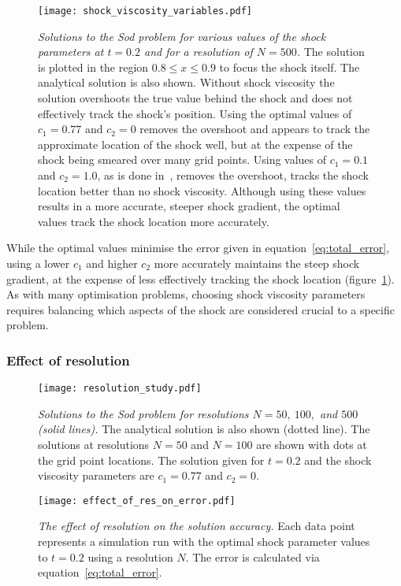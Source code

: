 \begin{figure}[t]
  \centering
  \texttt{[image: shock\_viscosity\_variables.pdf]}
  \caption{\emph{Solutions to the Sod problem for various values of the shock parameters at $t=0.2$ and for a resolution of $N=500$.} The solution is plotted in the region $0.8 \leq x \leq 0.9$ to focus the shock itself. The analytical solution is also shown. Without shock viscosity the solution overshoots the true value behind the shock and does not effectively track the shock's position. Using the optimal values of $c_1 = 0.77$ and $c_2 = 0$ removes the overshoot and appears to track the approximate location of the shock well, but at the expense of the shock being smeared over many grid points. Using values of $c_1 = 0.1$ and $c_2 = 1.0$, as is done in~\cite{arberStaggeredGridLagrangian2001}, removes the overshoot, tracks the shock location better than no shock viscosity. Although using these values results in a more accurate, steeper shock gradient, the optimal values track the shock location more accurately.}%
  \label{fig:shock_viscosity_variables}
\end{figure}

While the optimal values minimise the error given in equation~\eqref{eq:total_error}, using a lower $c_1$ and higher $c_2$ more accurately maintains the steep shock gradient, at the expense of less effectively tracking the shock location (figure~\ref{fig:shock_viscosity_variables}). As with many optimisation problems, choosing shock viscosity parameters requires balancing which aspects of the shock are considered crucial to a specific problem. 

\subsubsection{Effect of resolution}

\begin{figure}[t]
  \centering
  \texttt{[image: resolution\_study.pdf]}
  \caption{\emph{Solutions to the Sod problem for resolutions $N=50,\ 100,$ and $500$ (solid lines).} The analytical solution is also shown (dotted line). The solutions at resolutions $N=50$ and $N=100$ are shown with dots at the grid point locations. The solution given for $t=0.2$ and the shock viscosity parameters are $c_1 = 0.77$ and $c_2 = 0$.}
  \label{fig:resolution_study}
\end{figure}

\begin{figure}[t]
  \centering
  \texttt{[image: effect\_of\_res\_on\_error.pdf]}
  \caption{\emph{The effect of resolution on the solution accuracy.} Each data point represents a simulation run with the optimal shock parameter values to $t=0.2$ using a resolution $N$. The error is calculated via equation~\eqref{eq:total_error}.}%
  \label{fig:effect_of_res_on_error}
\end{figure}

